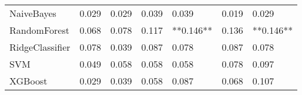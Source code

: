 \begin{tabular}{lllllll}
                     NaiveBayes & 0.029 &                     0.029 &                 0.039 &                  0.039 &                                   0.019 &     0.029 \\
                   RandomForest & 0.068 &                     0.078 &                 0.117 &              **0.146** &                                   0.136 & **0.146** \\
                RidgeClassifier & 0.078 &                     0.039 &                 0.087 &                  0.078 &                                   0.087 &     0.078 \\
                            SVM & 0.049 &                     0.058 &                 0.058 &                  0.058 &                                   0.078 &     0.097 \\
                        XGBoost & 0.029 &                     0.039 &                 0.058 &                  0.087 &                                   0.068 &     0.107 \\
\bottomrule
\end{tabular}
